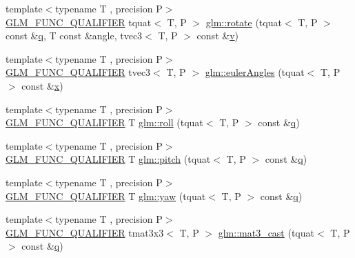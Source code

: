 \begin{DoxyCompactItemize}
\item 
{\footnotesize template$<$typename T , precision P$>$ }\\\mbox{\hyperlink{setup_8hpp_a33fdea6f91c5f834105f7415e2a64407}{G\+L\+M\+\_\+\+F\+U\+N\+C\+\_\+\+Q\+U\+A\+L\+I\+F\+I\+ER}} tquat$<$ T, P $>$ \mbox{\hyperlink{group__gtc__quaternion_gaa8f42979c921e450ff2812fb43c25702}{glm\+::rotate}} (tquat$<$ T, P $>$ const \&\mbox{\hyperlink{glad_8h_a514729309336df22bcc8eda979d6ced4}{q}}, T const \&angle, tvec3$<$ T, P $>$ const \&\mbox{\hyperlink{glad_8h_a14cfbe2fc2234f5504618905b69d1e06}{v}})
\item 
{\footnotesize template$<$typename T , precision P$>$ }\\\mbox{\hyperlink{setup_8hpp_a33fdea6f91c5f834105f7415e2a64407}{G\+L\+M\+\_\+\+F\+U\+N\+C\+\_\+\+Q\+U\+A\+L\+I\+F\+I\+ER}} tvec3$<$ T, P $>$ \mbox{\hyperlink{group__gtc__quaternion_gadb92ec1c1b0dd6b024176a73fbef3e64}{glm\+::euler\+Angles}} (tquat$<$ T, P $>$ const \&\mbox{\hyperlink{glad_8h_a92d0386e5c19fb81ea88c9f99644ab1d}{x}})
\item 
{\footnotesize template$<$typename T , precision P$>$ }\\\mbox{\hyperlink{setup_8hpp_a33fdea6f91c5f834105f7415e2a64407}{G\+L\+M\+\_\+\+F\+U\+N\+C\+\_\+\+Q\+U\+A\+L\+I\+F\+I\+ER}} T \mbox{\hyperlink{group__gtc__quaternion_ga4fd705376c6c1fd667be0055a0ea58ec}{glm\+::roll}} (tquat$<$ T, P $>$ const \&\mbox{\hyperlink{glad_8h_a514729309336df22bcc8eda979d6ced4}{q}})
\item 
{\footnotesize template$<$typename T , precision P$>$ }\\\mbox{\hyperlink{setup_8hpp_a33fdea6f91c5f834105f7415e2a64407}{G\+L\+M\+\_\+\+F\+U\+N\+C\+\_\+\+Q\+U\+A\+L\+I\+F\+I\+ER}} T \mbox{\hyperlink{group__gtc__quaternion_ga2c08b93a4261c10748fd4d2104346f17}{glm\+::pitch}} (tquat$<$ T, P $>$ const \&\mbox{\hyperlink{glad_8h_a514729309336df22bcc8eda979d6ced4}{q}})
\item 
{\footnotesize template$<$typename T , precision P$>$ }\\\mbox{\hyperlink{setup_8hpp_a33fdea6f91c5f834105f7415e2a64407}{G\+L\+M\+\_\+\+F\+U\+N\+C\+\_\+\+Q\+U\+A\+L\+I\+F\+I\+ER}} T \mbox{\hyperlink{group__gtc__quaternion_ga724a5df282b70cec0a6cb0d6dcddb6d6}{glm\+::yaw}} (tquat$<$ T, P $>$ const \&\mbox{\hyperlink{glad_8h_a514729309336df22bcc8eda979d6ced4}{q}})
\item 
{\footnotesize template$<$typename T , precision P$>$ }\\\mbox{\hyperlink{setup_8hpp_a33fdea6f91c5f834105f7415e2a64407}{G\+L\+M\+\_\+\+F\+U\+N\+C\+\_\+\+Q\+U\+A\+L\+I\+F\+I\+ER}} tmat3x3$<$ T, P $>$ \mbox{\hyperlink{group__gtc__quaternion_gae04c39422eb4e450ec8c4f45a1057b40}{glm\+::mat3\+\_\+cast}} (tquat$<$ T, P $>$ const \&\mbox{\hyperlink{glad_8h_a514729309336df22bcc8eda979d6ced4}{q}})

\end{DoxyCompactItemize}
